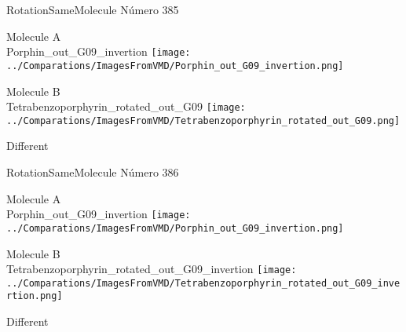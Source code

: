 \vtab[-2cm]
\begin{center}
{\large RotationSameMolecule \tab Número 385}
\end{center}
\begin{multicols}{2}
\begin{center}
Molecule A \\ 
Porphin\_out\_G09\_invertion
\texttt{[image: ../Comparations/ImagesFromVMD/Porphin\_out\_G09\_invertion.png]}
\\
\vtab

\columnbreak
Molecule B \\ 
Tetrabenzoporphyrin\_rotated\_out\_G09
\texttt{[image: ../Comparations/ImagesFromVMD/Tetrabenzoporphyrin\_rotated\_out\_G09.png]}
\\
\vtab


\end{center}
\end{multicols}
\begin{center}
\vtab
\vtab
\textcolor{NavyBlue}{\Large Different}
\end{center}

 \newpage

\vtab[-2cm]
\begin{center}
{\large RotationSameMolecule \tab Número 386}
\end{center}
\begin{multicols}{2}
\begin{center}
Molecule A \\ 
Porphin\_out\_G09\_invertion
\texttt{[image: ../Comparations/ImagesFromVMD/Porphin\_out\_G09\_invertion.png]}
\\
\vtab

\columnbreak
Molecule B \\ 
Tetrabenzoporphyrin\_rotated\_out\_G09\_invertion
\texttt{[image: ../Comparations/ImagesFromVMD/Tetrabenzoporphyrin\_rotated\_out\_G09\_invertion.png]}
\\
\vtab


\end{center}
\end{multicols}
\begin{center}
\vtab
\vtab
\textcolor{NavyBlue}{\Large Different}
\end{center}

 \newpage

